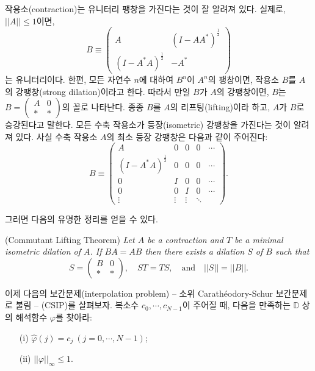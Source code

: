 \documentclass[12pt,a4paper,2sided]{article}
\newcommand{\vs}{\vspace}
\begin{document}

\vspace{.8 cm} \noindent 작용소(contraction)는 유니터리 팽창을
가진다는 것이 잘 알려져 있다. 실제로, $||A||\le 1$이면,
$$
B\equiv
\begin{pmatrix} A&(I-AA^*)^{\frac{1}{2}}\\(I-A^*A)^{\frac{1}{2}}&-A^*\end{pmatrix}
$$
는 유니터리이다. 한편, 모든 자연수 $n$에 대하여 $B^n$이 $A^n$의
팽창이면, 작용소 $B$를 $A$의 강팽창(strong dilation)이라고 한다.
따라서 만일 $B$가 $A$의 강팽창이면, $B$는 $B=\begin{pmatrix} A &0\\
*&*\end{pmatrix}$의 꼴로 나타난다. 종종 $B$를 $A$의
리프팅(lifting)이라 하고, $A$가 $B$로 승강된다고 말한다. 모든 수축
작용소가 등장(isometric) 강팽창을 가진다는 것이 알려져 있다. 사실
수축 작용소 $A$의 최소 등장 강팽창은 다음과 같이 주어진다:
$$
B\equiv
\begin{pmatrix}A&0&0&0&\cdots\\
(I-A^*A)^{\frac{1}{2}}&0&0&0&\cdots\\
0&I&0&0&\cdots\\
0&0&I&0&\cdots\\
\vdots&\vdots&\vdots&\ddots&
\end{pmatrix}.
$$

그러면  다음의 유명한 정리를 얻을 수 있다.


\vs{0.2cm}{\bf Theorem 3.2.1.} (Commutant Lifting Theorem) {\rm
\cite[p.658]{GGK}} {\sl  Let $A$ be a contraction and $T$ be a
minimal isometric dilation of $A$. If $BA=AB$ then there exists a
dilation $S$ of $B$ such that}
$$
S=\begin{pmatrix} B &0\\ *&*\end{pmatrix},\quad ST=TS,\quad \mbox{and}\quad ||S||=||B||.
$$


이제 다음의 보간문제(interpolation problem) -- 소위 Carath\'
eodory-Schur 보간문제로 불림 -- (CSIP)를 살펴보자. 복소수 $c_0,
\cdots, c_{N-1}$이 주어질 때, 다음을 만족하는 $\mathbb{D}$ 상의
해석함수 $\varphi$를 찾아라:
\begin{itemize}
\item[(i)] $\widehat{\varphi}(j)=c_j\ (j=0,\cdots, N-1)$;
\item[(ii)] $||\varphi||_{\infty}\le 1$.
\end{itemize}
\end{document}
